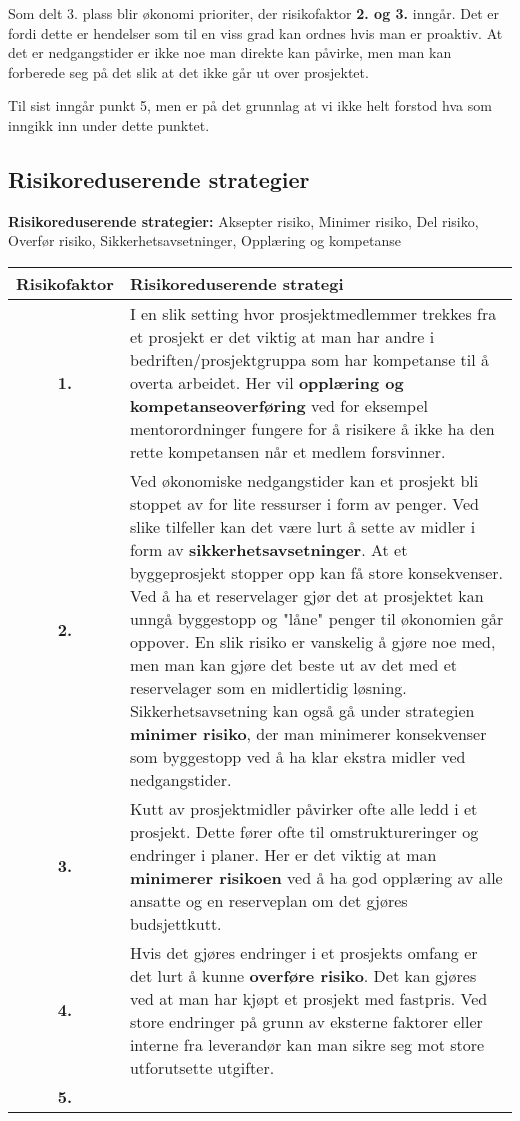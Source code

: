 		Som delt 3. plass blir økonomi prioriter, der risikofaktor {\bf 2. og 3.} inngår. 
		Det er fordi dette er hendelser som til en viss grad kan ordnes hvis man er proaktiv.
		At det er nedgangstider er ikke noe man direkte kan påvirke, men man kan forberede seg
		på det slik at det ikke går ut over prosjektet. 

		Til sist inngår punkt 5, men er på det grunnlag at vi ikke helt forstod hva som 
		inngikk inn under dette punktet. 

	\clearpage
	\subsection{Risikoreduserende strategier}

		{\bf Risikoreduserende strategier:} Aksepter risiko, Minimer risiko, Del risiko,
		Overfør risiko, Sikkerhetsavsetninger, Opplæring og kompetanse 

		\begin{table}[H]
		\begin{tabular}{ c p{10cm} }
			\hline
			{\bf Risikofaktor} & {\bf Risikoreduserende strategi} \\ \hline
			{\bf 1.} & I en slik setting hvor prosjektmedlemmer trekkes fra et prosjekt
			er det viktig at man har andre i bedriften/prosjektgruppa som har kompetanse
			til å overta arbeidet. Her vil {\bf opplæring og kompetanseoverføring} ved for eksempel
			mentorordninger fungere for å risikere å ikke ha den rette kompetansen når et 
			medlem forsvinner. \\ \hline
			{\bf 2.} & Ved økonomiske nedgangstider kan et prosjekt bli stoppet av for lite
			ressurser i form av penger. Ved slike tilfeller kan det være lurt å sette av midler
			i form av {\bf sikkerhetsavsetninger}. At et byggeprosjekt stopper opp kan få store 
			konsekvenser. Ved å ha et reservelager gjør det at prosjektet kan unngå byggestopp
			og "låne" penger til økonomien går oppover. En slik risiko er vanskelig å gjøre noe
			med, men man kan gjøre det beste ut av det med et reservelager som en midlertidig løsning. 
			Sikkerhetsavsetning kan også gå under strategien {\bf minimer risiko}, der man minimerer
			konsekvenser som byggestopp ved å ha klar ekstra midler ved nedgangstider. \\ \hline
			{\bf 3.} & Kutt av prosjektmidler påvirker ofte alle ledd i et prosjekt. Dette fører
			ofte til omstruktureringer og endringer i planer. Her er det viktig at man {\bf minimerer
			risikoen} ved å ha god opplæring av alle ansatte og en reserveplan om det gjøres 
			budsjettkutt. \\ \hline
			{\bf 4.} & Hvis det gjøres endringer i et prosjekts omfang er det lurt å kunne {\bf overføre
			risiko}. Det kan gjøres ved at man har kjøpt et prosjekt med fastpris. Ved store endringer
			på grunn av eksterne faktorer eller interne fra leverandør kan man sikre seg mot store
			utforutsette utgifter. \\ \hline
			{\bf 5.} & \\
			\hline
		\end{tabular}
	\end{table}
